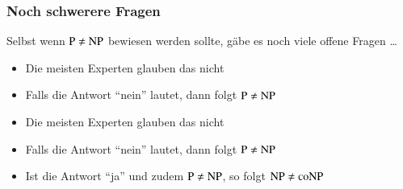 \documentclass[onlymath]{beamer}
\begin{document}
\begin{frame}\frametitle{Noch schwerere Fragen}

Selbst wenn ${\textsc{P}}\neq{\textsc{NP}}$ bewiesen werden sollte, gäbe es noch viele
offene Fragen \ldots\bigskip\pause

%
\begin{itemize}
\item Die meisten Experten glauben das nicht
\item Falls die Antwort "`nein"' lautet, dann folgt ${\textsc{P}}\neq{\textsc{NP}}$
\end{itemize}\bigskip\pause

%
\begin{itemize}
\item Die meisten Experten glauben das nicht
\item Falls die Antwort "`nein"' lautet, dann folgt ${\textsc{P}}\neq{\textsc{NP}}$
\item Ist die Antwort "`ja"' und zudem ${\textsc{P}}\neq{\textsc{NP}}$, so folgt ${\textsc{NP}}\neq{\textsc{coNP}}$
\end{itemize}\bigskip

\end{frame}
\end{document}
